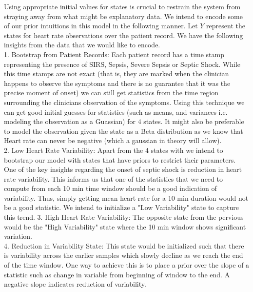 \documentclass[12pt,solutions]{article}
\begin{document}
Using appropriate initial values for states is crucial to restrain the system from straying away from what might be explanatory data. We intend to encode some of our prior intuitions in this model in the following manner. Let ${Y}$ represent the states for heart rate observations over the patient record. We have the following insights from the data that we would like to encode.\\
1. Bootstrap from Patient Records: Each patient record has a time stamp representing the presence of SIRS, Sepsis, Severe Sepsis or Septic Shock. While this time stamps are not exact (that is, they are marked when the clinician happens to observe the symptoms and there is no guarantee that it was the precise moment of onset) we can still get statistics from the time region surrounding the clinicians observation of the symptoms. Using this technique we can get good initial guesses for statistics (such as means, and variances i.e. modeling the observation as a Guassian) for 4 states. It might also be preferable to model the observation given the state as a Beta distribution as we know that Heart rate can never be negative (which a gaussian in theory will allow).\\
2. Low Heart Rate Variability: Apart from the 4 states with we intend to bootstrap our model with states that have priors to restrict their parameters. One of the key insights regarding the onset of septic shock is reduction in heart rate variability. This informs us that one of the statistics that we need to compute from each 10 min time window should be a good indication of variability. Thus, simply getting mean heart rate for a 10 min duration would not be a good statistic. We intend to initialize a "Low Variability" state to capture this trend.
3. High Heart Rate Variability: The opposite state from the pervious would be the "High Variability" state where the 10 min window shows significant variation.\\
4. Reduction in Variability State: This state would be initialized such that there is variability across the earlier samples which slowly decline as we reach the end of the time window. One way to achieve this is to place a prior over the slope of a statistic such as change in variable from beginning of window to the end. A negative slope indicates reduction of variability.\\
\end{document}

